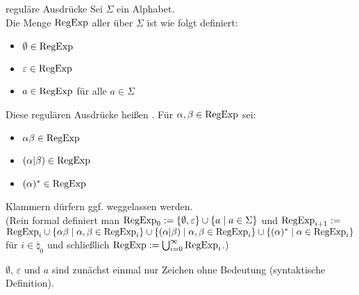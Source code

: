 \begin{Def}{reguläre Ausdrücke}
    Sei $\Sigma$ ein Alphabet.\\
    Die Menge $\text{RegExp}$ aller  über $\Sigma$ ist
    wie folgt definiert:
    \begin{itemize}
        \item
        $\emptyset \in \text{RegExp}$

        \item
        $\varepsilon \in \text{RegExp}$

        \item
        $a \in \text{RegExp}$ für alle $a \in \Sigma$
    \end{itemize}
    Diese regulären Ausdrücke heißen .
    Für $\alpha, \beta \in \text{RegExp}$ sei:
    \begin{itemize}
        \item
        $\alpha\beta \in \text{RegExp}$

        \item
        $(\alpha|\beta) \in \text{RegExp}$

        \item
        $(\alpha)^\ast \in \text{RegExp}$
    \end{itemize}
    Klammern dürfern ggf. weggelassen werden.\\
    (Rein formal definiert man
    $\text{RegExp}_0 := \{\emptyset, \varepsilon\} \cup \{a \;|\; a \in \Sigma\}$
    und $\text{RegExp}_{i+1} :=$\\
    $\text{RegExp}_i \cup
    \{\alpha\beta \;|\; \alpha, \beta \in \text{RegExp}_i\} \cup
    \{(\alpha|\beta) \;|\; \alpha, \beta \in \text{RegExp}_i\} \cup
    \{(\alpha)^\ast \;|\; \alpha \in \text{RegExp}_i\}$
    für $i \in \natural_0$ und schließlich
    $\text{RegExp} := \bigcup_{i=0}^\infty \text{RegExp}_i$.)

    $\emptyset$, $\varepsilon$ und $a$ sind zunächst einmal nur Zeichen
    ohne Bedeutung (syntaktische Definition).
\end{Def}

\linie

